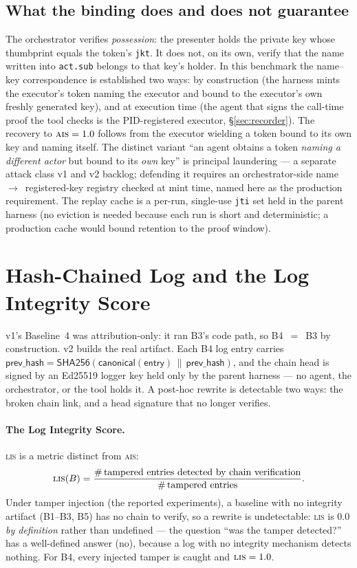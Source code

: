 \documentclass[11pt]{article}
\newcommand{\ais}{\textsc{ais}}
\newcommand{\lis}{\textsc{lis}}
\newcommand{\code}[1]{\texttt{#1}}
\newcommand{\actsub}{\code{act.sub}}
\newcommand{\jkt}{\code{jkt}}
\begin{document}
\subsection{What the binding does and does not guarantee}
The orchestrator verifies \emph{possession}: the presenter holds the private
key whose thumbprint equals the token's \jkt{}. It does not, on its own,
verify that the name written into \actsub{} belongs to that key's holder. In
this benchmark the name--key correspondence is established two ways: by
construction (the harness mints the executor's token naming the executor and
bound to the executor's own freshly generated key), and at execution time (the
agent that signs the call-time proof the tool checks is the PID-registered
executor, \S\ref{sec:recorder}). The recovery to $\ais{}=1.0$ follows from the
executor wielding a token bound to its own key and naming itself. The distinct
variant ``an agent obtains a token \emph{naming a different actor} but bound to
its \emph{own} key'' is principal laundering --- a separate attack class v1 and
v2 backlog; defending it requires an orchestrator-side name~$\to$~registered-key
registry checked at mint time, named here as the production requirement. The
replay cache is a per-run, single-use \code{jti} set held in the parent harness
(no eviction is needed because each run is short and deterministic; a
production cache would bound retention to the proof window).

\section{Hash-Chained Log and the Log Integrity Score}
\label{sec:lis}

v1's Baseline~4 was attribution-only: it ran B3's code path, so B4~$=$~B3 by
construction. v2 builds the real artifact. Each B4 log entry carries
$\textsf{prev\_hash} = \textsf{SHA256}(\textsf{canonical}(\textsf{entry})
\,\|\, \textsf{prev\_hash})$, and the chain head is signed by an Ed25519
logger key held only by the parent harness --- no agent, the orchestrator, or
the tool holds it. A post-hoc rewrite is detectable two ways: the broken
chain link, and a head signature that no longer verifies.

\paragraph{The Log Integrity Score.} \lis{} is a metric distinct from \ais{}:
\[
\lis(B) = \frac{\#\,\text{tampered entries detected by chain verification}}
{\#\,\text{tampered entries}}.
\]
Under tamper injection (the reported experiments), a baseline with no
integrity artifact (B1--B3, B5) has no chain to verify, so a rewrite is
undetectable: \lis{} is $0.0$ \emph{by definition}
rather than undefined --- the question ``was the tamper detected?'' has a
well-defined answer (no), because a log with no integrity mechanism detects
nothing. For B4, every injected tamper is caught and $\lis{}=1.0$.
\end{document}
